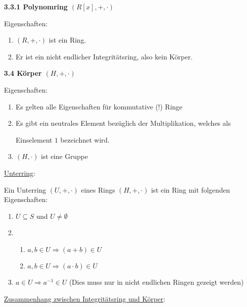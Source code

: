 \documentclass[18pt] {article}
\begin{document}
\textbf{3.3.1 Polynomring $(R[x], +, \cdot)$}
\begin{framed}
Eigenschaften: \\

\begin{enumerate}
\item $(R, +, \cdot)$ ist ein Ring.

\item Er ist ein nicht endlicher Integritätsring, also kein Körper.

\end{enumerate}
\end{framed}

\bigskip

\textbf{3.4 Körper $(H, +, \cdot)$}
\begin{framed}
Eigenschaften: \\

\begin{enumerate}
\item Es gelten alle Eigenschaften für kommutative (!) Ringe

\item Es gibt ein neutrales Element bezüglich der Multiplikation, welches als 

Einselement $1$ bezeichnet wird.

\item $(H, \cdot)$ ist eine Gruppe
\end{enumerate}
\end{framed} 
\bigskip
\pagebreak
\underline{\large Unterring}:

Ein Unterring $(U, +, \cdot)$ eines Rings $(H, +, \cdot)$ ist ein Ring mit folgenden Eigenschaften:\\

\begin{enumerate}
\item $U \subseteq S$ und $U \neq \emptyset$
\item
\begin{enumerate}
\item $a, b \in U \Rightarrow (a + b) \in U$

\item $a, b \in U\Rightarrow (a \cdot b) \in U$
\end{enumerate}

\item$a \in U \Rightarrow a^{-1} \in U$ (Dies muss nur in nicht endlichen Ringen gezeigt werden)
\end{enumerate}

\bigskip
\underline{Zusammenhang zwischen Integritätsring und Körper}:
\end{document}
